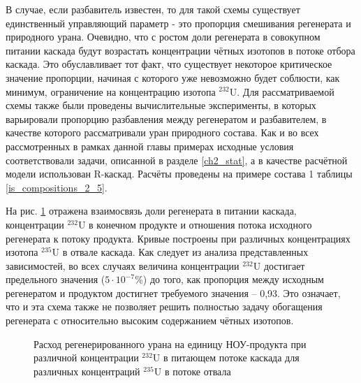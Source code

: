В случае, если разбавитель известен, то для такой схемы существует единственный управляющий параметр - это пропорция смешивания регенерата и природного урана. Очевидно, что с ростом доли регенерата в совокупном питании каскада будут возрастать концентрации чётных изотопов в потоке отбора каскада. Это обуславливает тот факт, что существует некоторое критическое значение пропорции, начиная с которого уже невозможно будет соблюсти, как минимум, ограничение на концентрацию изотопа $^{232}$U. Для рассматриваемой схемы также были проведены вычислительные эксперименты, в которых варьировали пропорцию разбавления между регенератом и разбавителем, в качестве которого рассматривали уран природного состава. Как и во всех рассмотренных в рамках данной главы примерах исходные условия соответствовали задачи, описанной в разделе \ref{ch2_stat}, а в качестве расчётной модели использован R-каскад. Расчёты проведены на примере состава 1 таблицы \ref{is_compositions_2_5}. 

На рис. \ref{sc3_1.second} отражена взаимосвязь доли регенерата в питании каскада, концентрации $^{232}$U в конечном продукте и отношения потока исходного регенерата к потоку продукта. Кривые построены при различных концентрациях изотопа $^{235}$U в отвале каскада. Как следует из анализа представленных зависимостей, во всех случаях величина концентрации  $^{232}$U достигает предельного значения ($5\cdot10^{-7}$\%) до того, как пропорция между исходным регенератом и продуктом достигнет требуемого значения -- 0,93. Это означает, что и эта схема также не позволяет решить полностью задачу обогащения регенерата с относительно высоким содержанием чётных изотопов. 

\begin{figure}[ht]
  \caption{Расход регенерированного урана на единицу НОУ-продукта  при различной концентрации $^{232}$U в питающем потоке каскада для различных концентраций $^{235}$U в потоке отвала}\label{sc3_1.second}
\end{figure}


